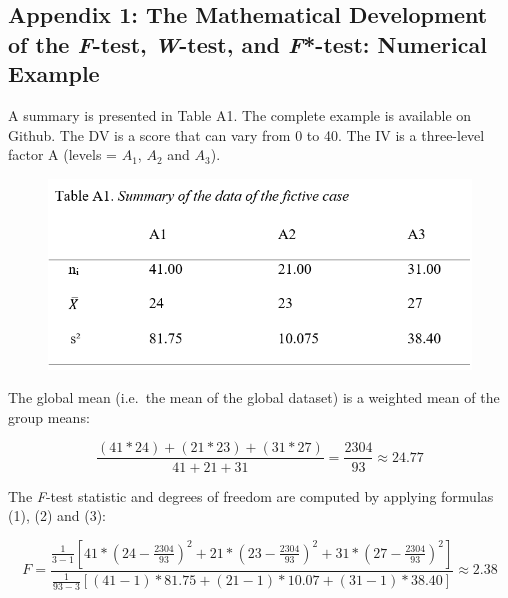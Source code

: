 \documentclass[man,floatsintext]{apa6}
\begin{document}
\begin{appendix}
\section{}
\setlength{\parindent}{0.0in}
\setlength{\leftskip}{0.0in}

\hypertarget{appendix-1-the-mathematical-development-of-the-f-test-w-test-and-f-test-numerical-example}{%
\subsection{\texorpdfstring{Appendix 1: The Mathematical Development of
the \emph{F}-test, \emph{W}-test, and \emph{F}*-test: Numerical
Example}{Appendix 1: The Mathematical Development of the F-test, W-test, and F*-test: Numerical Example}}\label{appendix-1-the-mathematical-development-of-the-f-test-w-test-and-f-test-numerical-example}}

A summary is presented in Table A1. The complete example is available on
Github. The DV is a score that can vary from 0 to 40. The IV is a
three-level factor A (levels = \(A_1\), \(A_2\) and \(A_3\)).

\begin{figure}
\includegraphics[width=1\linewidth]{Rmarkdown folder/Rmarkdown inputs/TableA1} \end{figure}

The global mean (i.e.~the mean of the global dataset) is a weighted mean
of the group means:

\[\frac{(41*24)+(21*23)+(31*27)}{41+21+31}=\frac{2304}{93} \approx 24.77\]

The \emph{F}-test statistic and degrees of freedom are computed by
applying formulas (1), (2) and (3):

\[
F=\frac{\frac{1}{3-1}[41*(24-\frac{2304}{93})^2+21*(23-\frac{2304}{93})^2+31*(27-\frac{2304}{93})^2]}
{\frac{1}{93-3}[(41-1)*81.75+(21-1)*10.07+(31-1)*38.40]} \approx 2.38
\]


\end{appendix}
\end{document}
